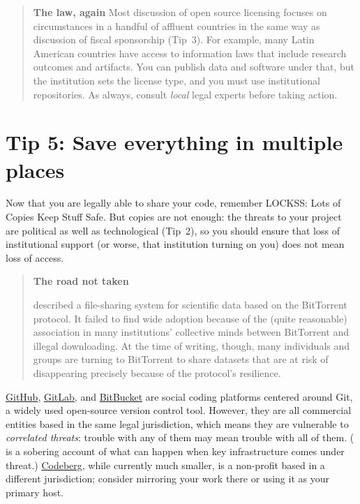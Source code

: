 \documentclass[10pt,letterpaper]{article}
\begin{document}
\begin{quote}
  \noindent
  \textbf{The law, again}
  Most discussion of open source licensing focuses on circumstances in a handful of affluent countries in the same way as discussion of fiscal sponsorship (Tip~3).
  For example, many Latin American countries have access to information laws that include research outcomes and artifacts.
  You can publish data and software under that, but the institution sets the license type, and you must use institutional repositories. As always, consult \emph{local} legal experts before taking action.
\end{quote}

\section*{Tip 5: Save everything in multiple places}

Now that you are legally able to share your code, remember LOCKSS: Lots of Copies Keep Stuff Safe.
But copies are not enough: the threats to your project are political as well as technological (Tip~2), so you should ensure that loss of institutional support (or worse, that institution turning on you)
does not mean loss of access.

\begin{quote}
  \noindent
  \textbf{The road not taken}

  \cite{Langille2010} described a file-sharing system for scientific data
  based on the BitTorrent protocol.
  It failed to find wide adoption because of the (quite reasonable) association in many institutions' collective minds
  between BitTorrent and illegal downloading.
  At the time of writing,
  though,
  many individuals and groups are turning to BitTorrent to share datasets that are at risk of disappearing
  precisely because of the protocol's resilience.
\end{quote}

\href{https://github.com/}{GitHub},
\href{https://gitlab.com}{GitLab},
and \href{https://bitbucket.org/}{BitBucket} are social coding platforms centered around Git, a widely used open-source version control tool.
However, they are all commercial entities based in the same legal jurisdiction,
which means they are vulnerable to \emph{correlated threats}: trouble with any of them may mean trouble with all of them.
(\cite{Tamburri2020} is a sobering account of what can happen when key infrastructure comes under threat.)
\href{https://codeberg.org/}{Codeberg}, while currently much smaller, is a non-profit based in a different jurisdiction; consider mirroring your work there or using it as your primary host.
\end{document}
